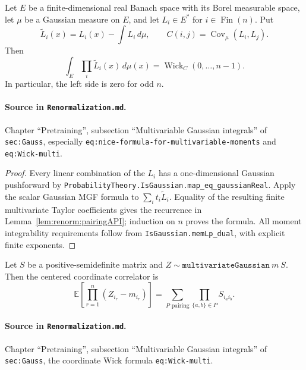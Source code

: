 \begin{theorem}
\label{thm:renorm:wick}
Let $E$ be a finite-dimensional real Banach space with its Borel measurable space, let $\mu$ be a
Gaussian measure on $E$, and let $L_i\in E^*$ for $i\in\operatorname{Fin}(n)$.  Put
\[
  \widetilde L_i(x)=L_i(x)-\int L_i\,d\mu,
  \qquad C(i,j)=\operatorname{Cov}_\mu(L_i,L_j).
\]
Then
\[
  \int_E\prod_i\widetilde L_i(x)\,d\mu(x)
  =\operatorname{Wick}_C(0,\ldots,n-1).
\]
In particular, the left side is zero for odd $n$.

\paragraph{Source in \texttt{Renormalization.md}.}
Chapter ``Pretraining'', subsection ``Multivariable Gaussian integrals'' of
\texttt{sec:Gauss}, especially \texttt{eq:nice-formula-for-multivariable-moments} and
\texttt{eq:Wick-multi}.
\end{theorem}

\begin{proof}
Every linear combination of the $L_i$ has a one-dimensional Gaussian pushforward by
\texttt{ProbabilityTheory.IsGaussian.map\_eq\_gaussianReal}.  Apply the scalar Gaussian MGF formula
to $\sum_i t_i\widetilde L_i$.  Equality of the resulting finite multivariate Taylor coefficients
gives the recurrence in Lemma~\ref{lem:renorm:pairingAPI}; induction on $n$ proves the formula.
All moment integrability requirements follow from \texttt{IsGaussian.memLp\_dual}, with explicit
finite exponents.
\end{proof}

\begin{corollary}
\label{cor:renorm:multivariateWick}
Let $S$ be a positive-semidefinite matrix and
$Z\sim\texttt{multivariateGaussian}\ m\ S$.  Then the centered coordinate correlator is
\[
  \mathbb E\!\left[\prod_{r=1}^n(Z_{i_r}-m_{i_r})\right]
  =\sum_{P\text{ pairing}}\prod_{\{a,b\}\in P}S_{i_a i_b}.
\]

\paragraph{Source in \texttt{Renormalization.md}.}
Chapter ``Pretraining'', subsection ``Multivariable Gaussian integrals'' of
\texttt{sec:Gauss}, the coordinate Wick formula \texttt{eq:Wick-multi}.
\end{corollary}

